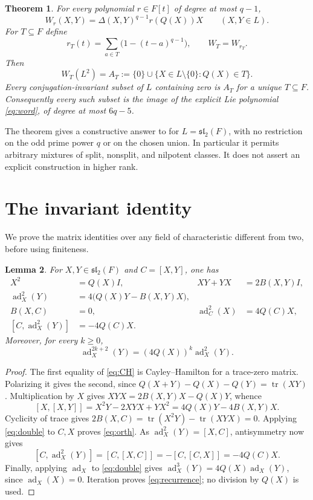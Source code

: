 \documentclass[11pt]{article}
\newtheorem{theorem}{Theorem}
\newtheorem{lemma}[theorem]{Lemma}
\newcommand{\ad}{\operatorname{ad}}
\newcommand{\tr}{\operatorname{tr}}
\newcommand{\slie}{\mathfrak{sl}}
\begin{document}
\newpage
\begin{theorem}\label{thm:main}
For every polynomial $r\in F[t]$ of degree at most $q-1$,
\begin{equation}\label{eq:evaluation}
 W_r(X,Y)=\Delta(X,Y)^{q-1}r(Q(X))X
 \qquad(X,Y\in L).
\end{equation}
For $T\subseteq F$ define
\begin{equation}\label{eq:indicator}
 r_T(t)=\sum_{a\in T}\bigl(1-(t-a)^{q-1}\bigr),\qquad W_T=W_{r_T}.
\end{equation}
Then
\begin{equation}\label{eq:image}
 W_T(L^2)=A_T:=\{0\}\cup\{X\in L\setminus\{0\}:Q(X)\in T\}.
\end{equation}
Every conjugation-invariant subset of $L$ containing zero is $A_T$ for a
unique $T\subseteq F$. Consequently every such subset is the image of the
explicit Lie polynomial \eqref{eq:word}, of degree at most $6q-5$.
\end{theorem}

The theorem gives a constructive answer to \cite[Question 1.2]{KS} for
$L=\slie_2(F)$, with no restriction on the odd prime power $q$ or on the
chosen union. In particular it permits arbitrary mixtures of split,
nonsplit, and nilpotent classes. It does not assert an explicit construction
in higher rank.

\section{The invariant identity}
We prove the matrix identities over any field of characteristic different
from two, before using finiteness.

\begin{lemma}\label{lem:identities}
For $X,Y\in\slie_2(F)$ and $C=[X,Y]$, one has
\begin{align}
 X^2&=Q(X)I, & XY+YX&=2B(X,Y)I,\label{eq:CH}\\
 \ad_X^2(Y)&=4\bigl(Q(X)Y-B(X,Y)X\bigr),\label{eq:double}\\
 B(X,C)&=0, & \ad_C^2(X)&=4Q(C)X,\label{eq:orth}\\
 [C,\ad_X^2(Y)]&=-4Q(C)X.\label{eq:transfer}
\end{align}
Moreover, for every $k\geq0$,
\begin{equation}\label{eq:recurrence}
 \ad_X^{2k+2}(Y)=(4Q(X))^k\ad_X^2(Y).
\end{equation}
\end{lemma}

\begin{proof}
The first equality of \eqref{eq:CH} is Cayley--Hamilton for a trace-zero
matrix. Polarizing it gives the second, since
$Q(X+Y)-Q(X)-Q(Y)=\tr(XY)$.
Multiplication by $X$ gives $XYX=2B(X,Y)X-Q(X)Y$, whence
\[
 [X,[X,Y]]=X^2Y-2XYX+YX^2
          =4Q(X)Y-4B(X,Y)X.
\]
Cyclicity of trace gives
$2B(X,C)=\tr(X^2Y)-\tr(XYX)=0$.
Applying \eqref{eq:double} to $C,X$ proves \eqref{eq:orth}.
As $\ad_X^2(Y)=[X,C]$, antisymmetry now gives
\[
 [C,\ad_X^2(Y)]=[C,[X,C]]=-[C,[C,X]]=-4Q(C)X.
\]
Finally, applying $\ad_X$ to \eqref{eq:double} gives
$\ad_X^3(Y)=4Q(X)\ad_X(Y)$, since $\ad_X(X)=0$.
Iteration proves \eqref{eq:recurrence}; no division by $Q(X)$ is used.
\end{proof}
\end{document}
